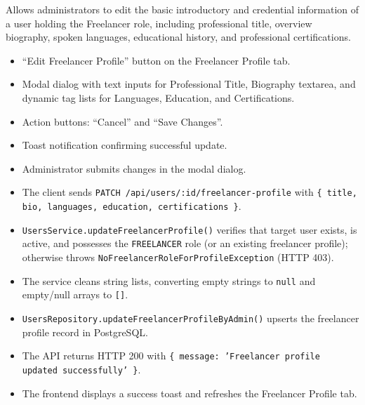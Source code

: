 \noindent Allows administrators to edit the basic introductory and credential information of a user holding the Freelancer role, including professional title, overview biography, spoken languages, educational history, and professional certifications.

\begin{itemize}[leftmargin=1.6em,topsep=3pt,itemsep=2pt,parsep=0pt,label=$\bullet$]
    \item ``Edit Freelancer Profile'' button on the Freelancer Profile tab.
    \item Modal dialog with text inputs for Professional Title, Biography textarea, and dynamic tag lists for Languages, Education, and Certifications.
    \item Action buttons: ``Cancel'' and ``Save Changes''.
    \item Toast notification confirming successful update.
\end{itemize}

\begin{itemize}[leftmargin=1.6em,topsep=3pt,itemsep=2pt,parsep=0pt,label=$\bullet$]
    \item Administrator submits changes in the modal dialog.
    \item The client sends \texttt{PATCH /api/users/:id/freelancer-profile} with \texttt{\{ title, bio, languages, education, certifications \}}.
    \item \texttt{UsersService.updateFreelancerProfile()} verifies that target user exists, is active, and possesses the \texttt{FREELANCER} role (or an existing freelancer profile); otherwise throws \texttt{NoFreelancerRoleForProfileException} (HTTP 403).
    \item The service cleans string lists, converting empty strings to \texttt{null} and empty/null arrays to \texttt{[]}.
    \item \texttt{UsersRepository.updateFreelancerProfileByAdmin()} upserts the freelancer profile record in PostgreSQL.
    \item The API returns HTTP 200 with \texttt{\{ message: 'Freelancer profile updated successfully' \}}.
    \item The frontend displays a success toast and refreshes the Freelancer Profile tab.
\end{itemize}

